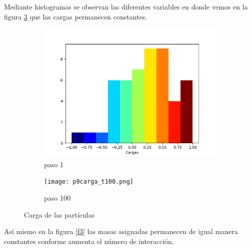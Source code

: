 \documentclass{article}
\begin{document}
Mediante histogramas se observan las diferentes variables en donde vemos en la figura \ref{f2} que  las cargas permanecen constantes.

\begin{figure}[H]
       \centering
       \begin{subfigure}[b]{0.60\linewidth}
           \includegraphics[width=\linewidth]{p9carga_t001.png}
           \caption{paso 1}
           \label{f1.a}
        \end{subfigure}
 \begin{subfigure}[b]{0.60\linewidth}
           \texttt{[image: p9carga\_t100.png]}
           \caption{paso 100}
           \label{f1.b}
        \end{subfigure}
\caption{Carga de las part\'iculas}
        \label{f2}
\end{figure}

As\'i mismo en la figura \ref{f3} las masas asignadas  permanecen de igual manera constantes conforme aumenta el n\'umero de interacci\'on.
\end{document}
